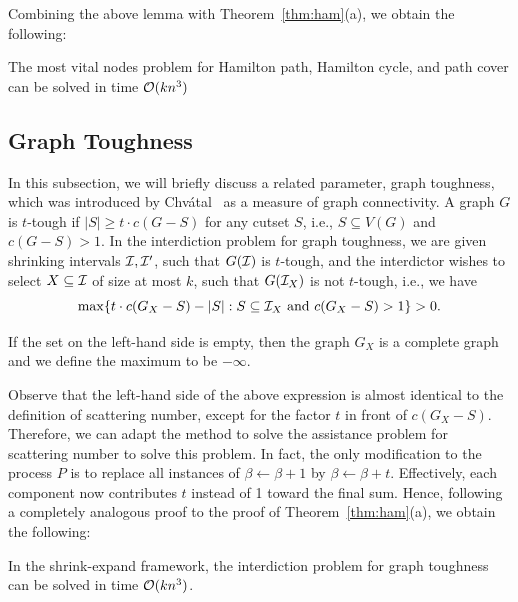 Combining the above lemma with Theorem~\ref{thm:ham}(a), we obtain the following:
\begin{corollary}
The most vital nodes problem  for Hamilton path, Hamilton cycle, and path cover can be solved in time $\mathcal{O}(kn^3)$
\end{corollary}

\subsection{Graph Toughness}
\label{subsection:tough}
In this subsection, we will briefly discuss a related parameter, graph toughness, which was introduced by Chv\'{a}tal~\cite{Chvatal1973} as a measure of graph connectivity. 
A graph $G$ is $t$-tough if $|S| \geq t \cdot c(G - S)$ for any cutset $S$, i.e., $S \subseteq V(G)$ and $c(G - S) > 1$.
In the interdiction problem for graph toughness, we are given shrinking intervals $\mathcal{I}, \mathcal{I}'$, such that $G(\mathcal{I})$ is $t$-tough, and the interdictor wishes to select $X \subseteq \mathcal{I}$ of size at most $k$, such that $G(\mathcal{I}_X)$ is not $t$-tough, i.e., we have
\[
	\max \{t \cdot c(G_X - S) - |S|  : S \subseteq \mathcal{I}_X \text{ and } c(G_X - S) > 1 \} > 0.
\]

If the set on the left-hand side is empty, then the graph $G_X$ is a complete graph and we define the maximum to be $-\infty$.

Observe that the left-hand side of the above expression is almost identical to the definition of scattering number, except for the factor $t$ in front of $c(G_X - S)$.
Therefore, we can adapt the method to solve the assistance problem for scattering number to solve this problem.
In fact, the only modification to the process $P$ is to replace all instances of $\beta \leftarrow \beta + 1$ by $\beta \leftarrow \beta + t$.
Effectively, each component now contributes $t$ instead of 1 toward the final sum.
Hence, following a completely analogous proof to the proof of Theorem~\ref{thm:ham}(a), we obtain the following:

\begin{corollary}
In the shrink-expand framework, the interdiction problem for graph toughness can be solved in time $\mathcal{O}(kn^3)$.
\end{corollary}
